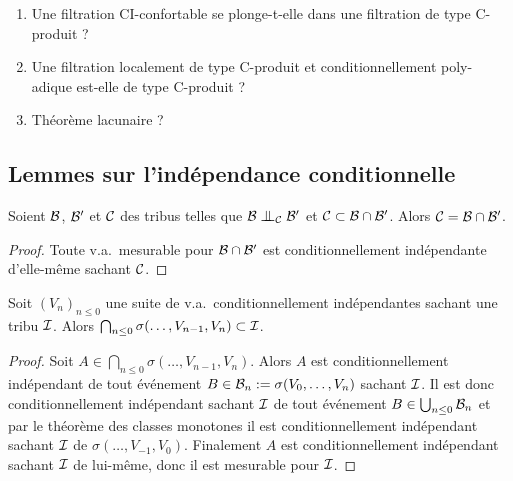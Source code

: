 \documentclass[12pt,a4paper]{article}
\begin{document}
\begin{enumerate}
\item Une filtration CI-confortable se plonge-t-elle dans une filtration de type 
C-produit ?

\item Une filtration localement de type C-produit et conditionnellement poly-adique 
est-elle de type C-produit ?

\item Théorème lacunaire ?
\end{enumerate}

\begin{appendices}

\section{Lemmes sur l'indépendance conditionnelle}

\begin{lemme}\label{lemme:CIinter}
Soient $\mathcal{B}$, $\mathcal{B}'$ et $\mathcal{C}$ des tribus telles que $\BB \indep_\CC \BB'$ 
et $\mathcal{C} \subset \mathcal{B} \cap \mathcal{B}'$. Alors $\mathcal{C} = \mathcal{B}\cap\mathcal{B}'$.
\end{lemme}

\begin{proof}
Toute v.a.\ mesurable pour $\mathcal{B}\cap\mathcal{B}'$ est conditionnellement indépendante 
d'elle-même sachant $\mathcal{C}$. 
\end{proof}


\begin{lemme}\label{lemme:tribuI}
Soit ${(V_n)}_{n \leq 0}$ une suite de v.a.\ conditionnellement indépendantes 
sachant une tribu $\mathcal{I}$. Alors 
$\bigcap_{n \leq 0}\sigma(\ldots, V_{n-1}, V_n) \subset \mathcal{I}$.
\end{lemme}

\begin{proof}
Soit $A \in \bigcap_{n \leq 0}\sigma(\ldots, V_{n-1}, V_n)$. Alors $A$ est conditionnellement 
indépendant de tout événement 
$B \in \mathcal{B}_n := \sigma(V_0, \ldots, V_n)$ sachant 
$\mathcal{I}$. Il est donc conditionnellement 
indépendant sachant $\mathcal{I}$ de tout événement 
$B \in \bigcup_{n \leq 0}\mathcal{B}_n$ et par le théorème des classes monotones 
il est conditionnellement indépendant sachant $\mathcal{I}$ de $\sigma(\ldots, V_{-1}, V_0)$. 
Finalement $A$ est conditionnellement indépendant sachant 
$\mathcal{I}$ de lui-même, donc il est mesurable pour $\mathcal{I}$. 
\end{proof}


\end{appendices}
\end{document}
